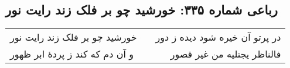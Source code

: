 \begin{center}
\section*{رباعی شماره ۳۳۵: خورشید چو بر فلک زند رایت نور}
\label{sec:sh335}
\begin{longtable}{l p{0.5cm} r}
خورشید چو بر فلک زند رایت نور
&&
در پرتو آن خیره شود دیده ز دور
\\
و آن دم که کند ز پردهٔ ابر ظهور
&&
فالناظر یجتلیه من غیر قصور
\\
\end{longtable}
\end{center}
